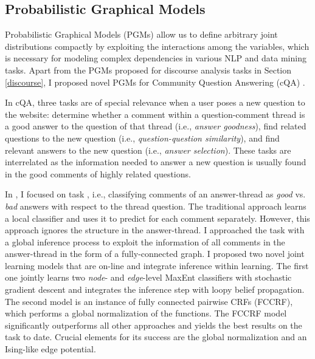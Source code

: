 \documentclass{article} %
\begin{document}
\subsection{Probabilistic Graphical Models}

Probabilistic Graphical Models (PGMs) allow us to define arbitrary joint distributions compactly by exploiting the interactions among the variables, which is necessary for modeling complex dependencies in various NLP and data mining tasks. Apart from the PGMs proposed for discourse analysis tasks in Section \ref{discourse}, I proposed novel PGMs for Community Question Answering (cQA) \cite{joty-EtAl:2015:EMNLP1,Shafiq16_cqa_naacl,Shafiq16_cqa_tacl}.

In cQA, three tasks are of special relevance when a user poses a new question to the website: \Na determine whether a comment within a question-comment thread is a good answer to the question of that thread  (i.e., \emph{answer goodness}), \Nb find related questions to the new question (i.e., \emph{question-question similarity}), and \Nc find relevant answers to the new question (i.e., \emph{answer selection}). These tasks are interrelated as the information needed to answer a new question is usually found in the good comments of highly related questions.


In \cite{joty-EtAl:2015:EMNLP1,Shafiq16_cqa_naacl}, I focused on task \Na, i.e., classifying comments of an answer-thread as \emph{good} vs. \emph{bad} answers with respect to the thread question. The traditional approach learns a local classifier and uses it to predict for each comment separately. However, this approach ignores the structure in the answer-thread. I approached the task with a global inference process to exploit the information of all comments in the answer-thread in the form of a fully-connected graph. I proposed two novel joint learning models that are on-line and integrate inference within learning. The first one jointly learns two \emph{node}- and \emph{edge}-level MaxEnt classifiers with stochastic gradient descent and integrates the inference step with loopy belief propagation. The second model is an instance of fully connected pairwise CRFs (FCCRF), which performs a global normalization of the functions. The FCCRF model significantly outperforms all other approaches and yields the best results on the task to date. Crucial elements for its success are the global normalization and an Ising-like edge potential.    
\end{document}
